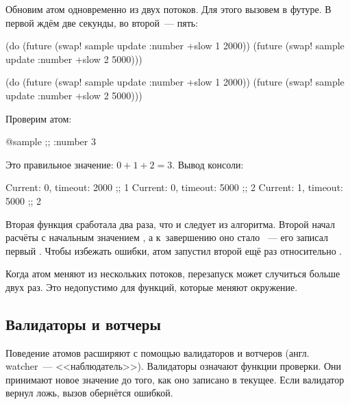 Обновим атом одновременно из двух потоков. Для этого вызовем  в
футуре. В первой ждём две секунды, во второй~--- пять:

\ifnarrow

\begin{clojure}
(do (future (swap! sample update
              :number +slow 1 2000))
    (future (swap! sample update
              :number +slow 2 5000)))
\end{clojure}

\else

\begin{clojure}
(do (future (swap! sample update :number +slow 1 2000))
    (future (swap! sample update :number +slow 2 5000)))
\end{clojure}

\fi

\noindent
Проверим атом:

\begin{clojure}
@sample ;; {:number 3}
\end{clojure}

\noindent
Это правильное значение: $0 + 1 + 2 = 3$. Вывод консоли:

\begin{text}
Current: 0, timeout: 2000 ;; 1
Current: 0, timeout: 5000 ;; 2
Current: 1, timeout: 5000 ;; 2
\end{text}

Вторая функция сработала два раза, что и следует из алгоритма. Второй
 начал расчёты с начальным значением , а
к~завершению оно стало ~--- его записал первый
. Чтобы избежать ошибки, атом запустил второй  ещё раз
относительно .

Когда атом меняют из нескольких потоков, перезапуск может случиться больше двух
раз. Это недопустимо для функций, которые меняют окружение.

\subsection{Валидаторы и вотчеры}


Поведение атомов расширяют с помощью валидаторов и вотчеров (англ. watcher~---
<<наблюдатель>>). Валидаторы означают функции проверки. Они принимают новое
значение до того, как оно записано в текущее. Если валидатор вернул ложь, вызов
 обернётся ошибкой.

